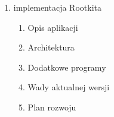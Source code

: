 \begin{enumerate}
  \item implementacja Rootkita
    \begin{enumerate}
	\item Opis aplikacji
	\item Architektura
	\item Dodatkowe programy
 	\item Wady aktualnej wersji
 	\item Plan rozwoju
    \end{enumerate}
    
\end{enumerate}